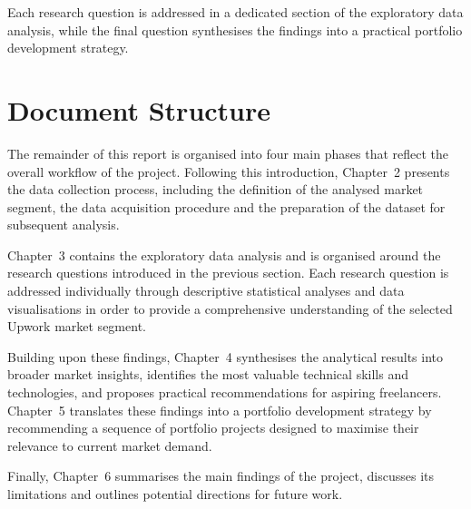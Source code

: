     Each research question is addressed in a dedicated section of the exploratory data analysis,
    while the final question synthesises the findings into a practical portfolio development strategy.

    \section{Document Structure}

    The remainder of this report is organised into four main phases that reflect the overall workflow of the project.
    Following this introduction, Chapter~2 presents the data collection process, including the definition of the analysed market segment,
    the data acquisition procedure and the preparation of the dataset for subsequent analysis.

    Chapter~3 contains the exploratory data analysis and is organised around the research questions introduced in the previous section.
    Each research question is addressed individually through descriptive statistical analyses and data visualisations in order to provide a
    comprehensive understanding of the selected Upwork market segment.

    Building upon these findings, Chapter~4 synthesises the analytical results into broader market insights, identifies the most valuable
    technical skills and technologies, and proposes practical recommendations for aspiring freelancers. Chapter~5 translates these findings
    into a portfolio development strategy by recommending a sequence of portfolio projects designed to maximise
    their relevance to current market demand.

    Finally, Chapter~6 summarises the main findings of the project, discusses its limitations and outlines potential directions for future work.